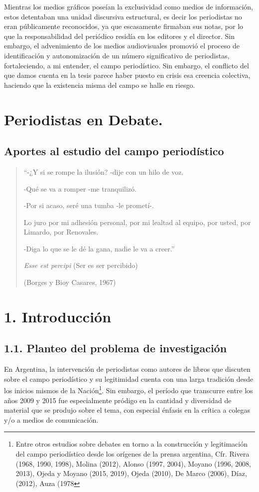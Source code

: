 Mientras los medios gráficos poseían la exclusividad como medios de información, estos detentaban una unidad discursiva estructural, es decir los periodistas no eran públicamente reconocidos, ya que escasamente firmaban sus notas, por lo que la responsabilidad del periódico residía en los editores y el director. Sin embargo, el advenimiento de los medios audiovisuales promovió el proceso de identificación y autonomización de un número significativo de periodistas, fortaleciendo, a mi entender, el campo periodístico. Sin embargo, el conflicto del que damos cuenta en la tesis parece haber puesto en crisis esa creencia colectiva, haciendo que la existencia misma del campo se halle en riesgo.




\chapter{Periodistas en Debate.}

\section{Aportes al estudio del campo periodístico}




\begin{quote}
``-¿Y si se rompe la ilusión? -dije con un hilo de voz.

-Qué se va a romper -me tranquilizó.

-Por si acaso, seré una tumba -le prometí-.

Lo juro por mi adhesión personal, por mi lealtad al equipo, por usted, por Limardo, por Renovales.

-Diga lo que se le dé la gana, nadie le va a creer.''

\emph{Esse est percipi} (Ser es ser percibido)

(Borges y Bioy Casares, 1967)
\end{quote}


\chapter{1. Introducción}


\section{1.1. Planteo del problema de investigación}

En Argentina, la intervención de periodistas como autores de libros que discuten sobre el campo periodístico y su legitimidad cuenta con una larga tradición desde los inicios mismos de la Nación\footnote{Entre otros estudios sobre debates en torno a la construcción y legitimación del campo periodístico desde los orígenes de la prensa argentina, Cfr. Rivera (1968, 1990, 1998), Molina (2012), Alonso (1997, 2004), Moyano (1996, 2008, 2013), Ojeda y Moyano (2015, 2019), Ojeda (2010), De Marco (2006), Díaz, (2012), Auza (1978}. Sin embargo, el período que transcurre entre los años 2009 y 2015 fue especialmente pródigo en la cantidad y diversidad de material que se produjo sobre el tema, con especial énfasis en la crítica a colegas y/o a medios de comunicación.

